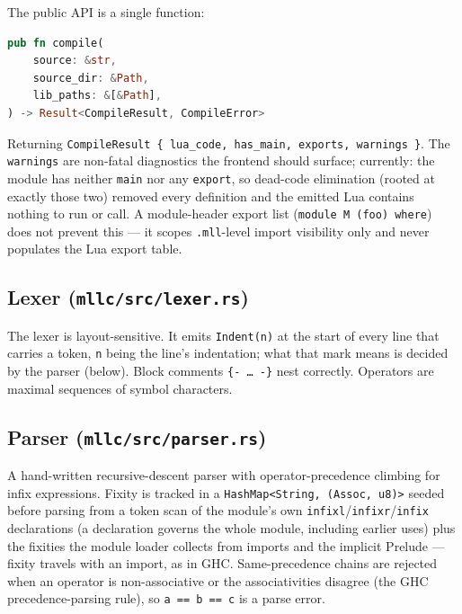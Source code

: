 \documentclass[11pt,a4paper]{article}
\begin{document}
The public API is a single function:
\begin{lstlisting}[language=Rust]
pub fn compile(
    source: &str,
    source_dir: &Path,
    lib_paths: &[&Path],
) -> Result<CompileResult, CompileError>
\end{lstlisting}

Returning \texttt{CompileResult \{ lua\_code, has\_main, exports, warnings \}}.
The \texttt{warnings} are non-fatal diagnostics the frontend should surface;
currently: the module has neither \texttt{main} nor any \texttt{export}, so
dead-code elimination (rooted at exactly those two) removed every definition
and the emitted Lua contains nothing to run or call.  A module-header export
list (\texttt{module M (foo) where}) does not prevent this --- it scopes
\texttt{.mll}-level import visibility only and never populates the Lua
export table.

\subsection{Lexer (\texttt{mllc/src/lexer.rs})}

The lexer is layout-sensitive.  It emits \texttt{Indent(n)} at the start of
every line that carries a token, \texttt{n} being the line's indentation; what
that mark means is decided by the parser (below).  Block comments
\texttt{\{- \ldots\ -\}} nest correctly.  Operators are maximal sequences of
symbol characters.

\subsection{Parser (\texttt{mllc/src/parser.rs})}

A hand-written recursive-descent parser with operator-precedence climbing for
infix expressions.  Fixity is tracked in a \texttt{HashMap<String, (Assoc, u8)>}
seeded before parsing from a token scan of the module's own
\texttt{infixl}/\texttt{infixr}/\texttt{infix} declarations (a declaration
governs the whole module, including earlier uses) plus the fixities the module
loader collects from imports and the implicit Prelude --- fixity travels with
an import, as in GHC.  Same-precedence chains are rejected when an operator is
non-associative or the associativities disagree (the GHC precedence-parsing
rule), so \texttt{a == b == c} is a parse error.
\end{document}
